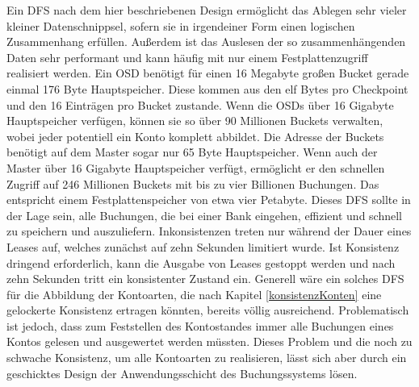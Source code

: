 \documentclass[12pt,oneside,a4paper,parskip]{scrbook}
\begin{document}
Ein DFS nach dem hier beschriebenen Design ermöglicht das Ablegen sehr vieler kleiner Datenschnippsel, sofern sie in irgendeiner Form einen logischen Zusammenhang erfüllen. Außerdem ist das Auslesen der so zusammenhängenden Daten sehr performant und kann häufig mit nur einem Festplattenzugriff realisiert werden. Ein OSD benötigt für einen 16 Megabyte großen Bucket gerade einmal 176 Byte Hauptspeicher. Diese kommen aus den elf Bytes pro Checkpoint und den 16 Einträgen pro Bucket zustande. Wenn die OSDs über 16 Gigabyte Hauptspeicher verfügen, können sie so über 90 Millionen Buckets verwalten, wobei jeder potentiell ein Konto komplett abbildet. Die Adresse der Buckets benötigt auf dem Master sogar nur 65 Byte Hauptspeicher. Wenn auch der Master über 16 Gigabyte Hauptspeicher verfügt, ermöglicht er den schnellen Zugriff auf 246 Millionen Buckets mit bis zu vier Billionen Buchungen. Das entspricht einem Festplattenspeicher von etwa vier Petabyte. Dieses DFS sollte in der Lage sein, alle Buchungen, die bei einer Bank eingehen, effizient und schnell zu speichern und auszuliefern. Inkonsistenzen treten nur während der Dauer eines Leases auf, welches zunächst auf zehn Sekunden limitiert wurde. Ist Konsistenz dringend erforderlich, kann die Ausgabe von Leases gestoppt werden und nach zehn Sekunden tritt ein konsistenter Zustand ein. Generell wäre ein solches DFS für die Abbildung der Kontoarten, die nach Kapitel \ref{konsistenzKonten} eine gelockerte Konsistenz ertragen könnten, bereits völlig ausreichend. Problematisch ist jedoch, dass zum Feststellen des Kontostandes immer alle Buchungen eines Kontos gelesen und ausgewertet werden müssten. Dieses Problem und die noch zu schwache Konsistenz, um alle Kontoarten zu realisieren, lässt sich aber durch ein geschicktes Design der Anwendungsschicht des Buchungssystems lösen.
\end{document}
